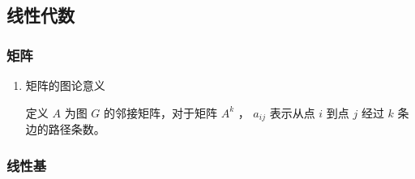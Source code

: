 \documentclass[11pt]{article}
\begin{document}
\subsection{线性代数}
\label{sec-3-2}
\subsubsection{矩阵}
\label{sec-3-2-1}
\begin{enumerate}
\item 矩阵的图论意义
\label{sec-3-2-1-1}

定义 $A$ 为图 $G$ 的邻接矩阵，对于矩阵 $A^k$ ， $a_{ij}$ 表示从点 $i$ 到点 $j$ 经过 $k$ 条边的路径条数。
\end{enumerate}

\subsubsection{线性基}
\label{sec-3-2-2}
\end{document}

